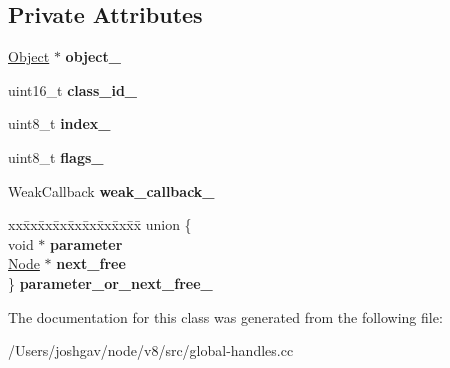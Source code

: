\subsection*{Private Attributes}
\begin{DoxyCompactItemize}
\item 
\hyperlink{classv8_1_1internal_1_1_object}{Object} $\ast$ {\bfseries object\+\_\+}\hypertarget{classv8_1_1internal_1_1_global_handles_1_1_node_a798deedf56ddc6d5d2af3457a5c16c8c}{}\label{classv8_1_1internal_1_1_global_handles_1_1_node_a798deedf56ddc6d5d2af3457a5c16c8c}

\item 
uint16\+\_\+t {\bfseries class\+\_\+id\+\_\+}\hypertarget{classv8_1_1internal_1_1_global_handles_1_1_node_a81dc6adc4db935794ac319c250c5b84a}{}\label{classv8_1_1internal_1_1_global_handles_1_1_node_a81dc6adc4db935794ac319c250c5b84a}

\item 
uint8\+\_\+t {\bfseries index\+\_\+}\hypertarget{classv8_1_1internal_1_1_global_handles_1_1_node_ac7116e977f3715ecb505ec7b95b95f84}{}\label{classv8_1_1internal_1_1_global_handles_1_1_node_ac7116e977f3715ecb505ec7b95b95f84}

\item 
uint8\+\_\+t {\bfseries flags\+\_\+}\hypertarget{classv8_1_1internal_1_1_global_handles_1_1_node_af138f3b161960c518e24cdc36c602ff0}{}\label{classv8_1_1internal_1_1_global_handles_1_1_node_af138f3b161960c518e24cdc36c602ff0}

\item 
Weak\+Callback {\bfseries weak\+\_\+callback\+\_\+}\hypertarget{classv8_1_1internal_1_1_global_handles_1_1_node_a84377e381661f44ee2beb5f6ed8e293d}{}\label{classv8_1_1internal_1_1_global_handles_1_1_node_a84377e381661f44ee2beb5f6ed8e293d}

\item 
\begin{tabbing}
xx\=xx\=xx\=xx\=xx\=xx\=xx\=xx\=xx\=\kill
union \{\\
\>void $\ast$ {\bfseries parameter}\\
\>\hyperlink{classv8_1_1internal_1_1_global_handles_1_1_node}{Node} $\ast$ {\bfseries next\_free}\\
\} {\bfseries parameter\_or\_next\_free\_}\hypertarget{classv8_1_1internal_1_1_global_handles_1_1_node_ade3f49953bcf248a910f381e8de8bfcf}{}\label{classv8_1_1internal_1_1_global_handles_1_1_node_ade3f49953bcf248a910f381e8de8bfcf}
\\

\end{tabbing}\end{DoxyCompactItemize}


The documentation for this class was generated from the following file\+:\begin{DoxyCompactItemize}
\item 
/\+Users/joshgav/node/v8/src/global-\/handles.\+cc\end{DoxyCompactItemize}
